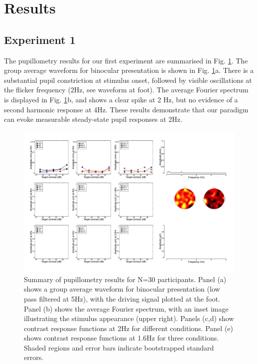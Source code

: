 \documentclass[
]{article}
\begin{document}
\hypertarget{results}{%
\section{Results}\label{results}}

\hypertarget{experiment-1}{%
\subsection{Experiment 1}\label{experiment-1}}

The pupillometry results for our first experiment are summarised in Fig. \ref{fig:pupildata}. The group average waveform for binocular presentation is shown in Fig. \ref{fig:pupildata}a. There is a substantial pupil constriction at stimulus onset, followed by visible oscillations at the flicker frequency (2Hz, see waveform at foot). The average Fourier spectrum is displayed in Fig. \ref{fig:pupildata}b, and shows a clear spike at 2 Hz, but no evidence of a second harmonic response at 4Hz. These results demonstrate that our paradigm can evoke measurable steady-state pupil responses at 2Hz.

\begin{figure}

{\centering \includegraphics{Figures/blank} 

}

\caption{Summary of pupillometry results for N=30 participants. Panel (a) shows a group average waveform for binocular presentation (low pass filtered at 5Hz), with the driving signal plotted at the foot. Panel (b) shows the average Fourier spectrum, with an inset image illustrating the stimulus appearance (upper right). Panels (c,d) show contrast response functions at 2Hz for different conditions. Panel (e) shows contrast response functions at 1.6Hz for three conditions. Shaded regions and error bars indicate bootstrapped standard errors.}\label{fig:pupildata}
\end{figure}
\end{document}

